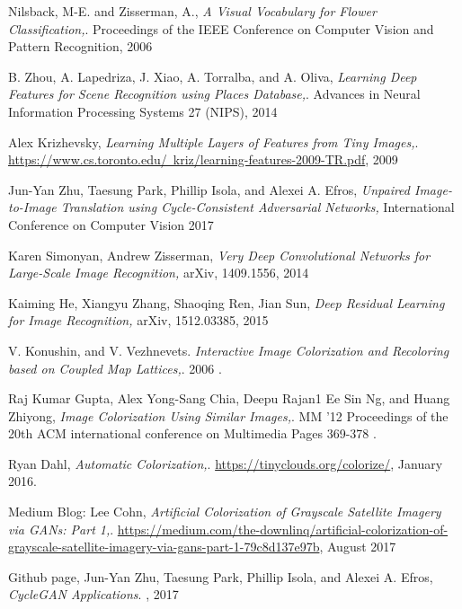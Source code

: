 \documentclass{article} %
\begin{document}
\begin{thebibliography}{999}
Nilsback, M-E. and Zisserman, A.,
\textit{A Visual Vocabulary for Flower Classification,}. 
Proceedings of the IEEE Conference on Computer Vision and Pattern Recognition, 2006

B. Zhou, A. Lapedriza, J. Xiao, A. Torralba, and A. Oliva,
\textit{Learning Deep Features for Scene Recognition using Places Database,}. 
Advances in Neural Information Processing Systems 27 (NIPS), 2014

\bibitem{} 
Alex Krizhevsky,
\textit{Learning Multiple Layers of Features from Tiny Images,}. 
\href{https://www.cs.toronto.edu/~kriz/learning-features-2009-TR.pdf}{https://www.cs.toronto.edu/~kriz/learning-features-2009-TR.pdf},
2009

Jun-Yan Zhu, Taesung Park, Phillip Isola, and Alexei A. Efros,
\textit{Unpaired Image-to-Image Translation using Cycle-Consistent Adversarial Networks,} 
International Conference on Computer Vision 2017

Karen Simonyan, Andrew Zisserman,
\textit{Very Deep Convolutional Networks for Large-Scale Image Recognition,} 
arXiv, 1409.1556, 2014

Kaiming He, Xiangyu Zhang, Shaoqing Ren, Jian Sun,
\textit{Deep Residual Learning for Image Recognition,} 
arXiv, 1512.03385, 2015

V. Konushin, and V. Vezhnevets. 
\textit{Interactive Image Colorization and Recoloring based on Coupled Map Lattices,}. 
2006 .

Raj Kumar Gupta, Alex Yong-Sang Chia, Deepu Rajan1 Ee Sin Ng, and Huang Zhiyong,
\textit{Image Colorization Using Similar Images,}. 
MM '12 Proceedings of the 20th ACM international conference on Multimedia
Pages 369-378 .

Ryan Dahl,
\textit{Automatic Colorization,}. 
\href{https://tinyclouds.org/colorize/}{https://tinyclouds.org/colorize/},
January 2016.

\bibitem{} 
Medium Blog: Lee Cohn,
\textit{Artificial Colorization of Grayscale Satellite Imagery via GANs: Part 1,}. 
\href{https://medium.com/the-downlinq/artificial-colorization-of-grayscale-satellite-imagery-via-gans-part-1-79c8d137e97b}{https://medium.com/the-downlinq/artificial-colorization-of-grayscale-satellite-imagery-via-gans-part-1-79c8d137e97b},
August 2017

Github page, Jun-Yan Zhu, Taesung Park, Phillip Isola, and Alexei A. Efros,
 \textit{CycleGAN Applications}. 
\href{https://junyanz.github.io/CycleGAN/}, 2017


\end{thebibliography}
\end{document}
